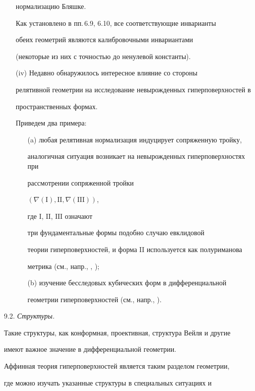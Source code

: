 \begin{itemize}
нормализацию Бляшке.

Как установлено в пп.\,6.9, 6.10, все соответствующие инварианты

обеих геометрий являются калибровочными инвариантами

(некоторые из них с точностью до ненулевой константы).

\item[(iv)] Недавно обнаружилось интересное влияние со стороны

релятивной геометрии на исследование невырожденных гиперповерхностей в

пространственных формах.

Приведем два примера:

\begin{itemize}

\item[(a)] любая релятивная нормализация индуцирует сопряженную тройку,

аналогичная ситуация возникает на невырожденных гиперповерхностях при

рассмотрении сопряженной тройки

$(\nabla (\mathrm{I}), \mathrm{II}, \nabla (\mathrm{III}))$,

где $\mathrm I$, $\mathrm{II}$, $\mathrm{III}$ означают

три фундаментальные формы подобно случаю евклидовой

теории гиперповерхностей, и форма $\mathrm{II}$ используется как полуриманова

метрика (см., напр., \cite{LUS-1}, \cite{LUS-2});

\item[(b)] изучение бесследовых кубических форм в дифференциальной

геометрии гиперповерхностей (см., напр., \cite{DIL-V-V}).

\end{itemize}

\end{itemize}



9.2. {\it Структуры.}

Такие структуры, как конформная, проективная, структура Вейля и другие

имеют важное значение в дифференциальной геометрии.

Аффинная теория гиперповерхностей является таким разделом геометрии,

где можно изучать указанные структуры в специальных ситуациях и

